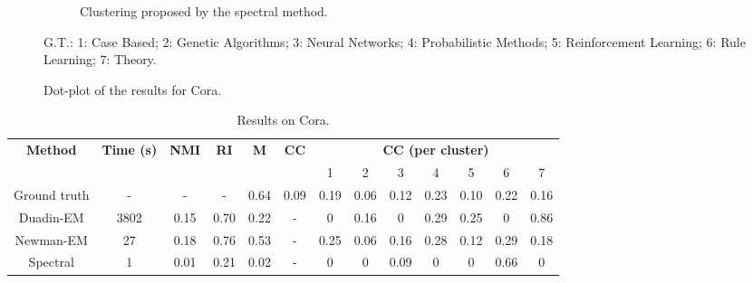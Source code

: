 \documentclass[switch, 12pt]{article}
\begin{document}
\begin{figure}[H]
\begin{subfigure}{0.45\linewidth}
        \caption{Clustering proposed by the spectral method.}
        \label{fig:cora_spectral}
    \end{subfigure}
    \hfill
    \caption{Dot-plot of the results for Cora.}
    \scriptsize{G.T.: 1: Case Based; 2: Genetic Algorithms; 3: Neural Networks; 4: Probabilistic Methods; 5: Reinforcement Learning; 6: Rule Learning; 7: Theory.}
    \label{fig:cora_results}
\end{figure}

\begin{table}[H]
    \centering
    \setlength\heavyrulewidth{0.25ex}
    \begin{tabular}{@{}ccccccccccccc@{}}
        \toprule
        \multirow{2}{*}{\textbf{Method}}  & \multirow{2}{*}{\textbf{Time (s)}} & \multirow{2}{*}{\textbf{NMI}} & \multirow{2}{*}{\textbf{RI}} & \multirow{2}{*}{\textbf{M}} & \multirow{2}{*}{\textbf{CC}} & \multicolumn{7}{c}{\textbf{CC (per cluster)}}                                           \\
                                          &                                    &                               &                              &                             &                              & 1                                             & 2    & 3    & 4    & 5    & 6    & 7    \\ \midrule
        \multicolumn{1}{c|}{Ground truth} & \multicolumn{1}{c|}{-}             & -                             & \multicolumn{1}{c|}{-}       & 0.64                        & 0.09                         & 0.19                                          & 0.06 & 0.12 & 0.23 & 0.10 & 0.22 & 0.16 \\
        \multicolumn{1}{c|}{Duadin-EM}    & \multicolumn{1}{c|}{3802}          & 0.15                          & \multicolumn{1}{c|}{0.70}    & 0.22                        & -                            & 0                                             & 0.16 & 0    & 0.29 & 0.25 & 0    & 0.86 \\
        \multicolumn{1}{c|}{Newman-EM}    & \multicolumn{1}{c|}{27}            & 0.18                          & \multicolumn{1}{c|}{0.76}    & 0.53                        & -                            & 0.25                                          & 0.06 & 0.16 & 0.28 & 0.12 & 0.29 & 0.18 \\
        \multicolumn{1}{c|}{Spectral}     & \multicolumn{1}{c|}{1}             & 0.01                          & \multicolumn{1}{c|}{0.21}    & 0.02                        & -                            & 0                                             & 0    & 0.09 & 0    & 0    & 0.66 & 0    \\ \bottomrule
    \end{tabular}
    \caption{Results on Cora.}
    \label{tab:cora_results}
\end{table}
\end{document}
